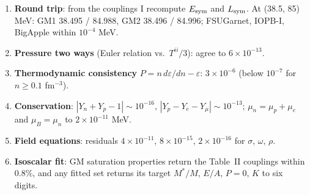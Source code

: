\documentclass[11pt,a4paper]{article}
\newcommand{\Esym}{E_{\rm sym}}
\newcommand{\Lsym}{L_{\rm sym}}
\begin{document}
\begin{enumerate}
\item \textbf{Round trip}: from the couplings I recompute $\Esym$ and $\Lsym$. At (38.5, 85) MeV: GM1 38.495 / 84.988, GM2 38.496 / 84.996; FSUGarnet, IOPB-I, BigApple within $10^{-4}$ MeV.
\item \textbf{Pressure two ways} (Euler relation vs.\ $T^{ii}/3$): agree to $6\times10^{-13}$.
\item \textbf{Thermodynamic consistency} $P=n\,d\varepsilon/dn-\varepsilon$: $3\times10^{-6}$ (below $10^{-7}$ for $n\ge0.1$ fm$^{-3}$).
\item \textbf{Conservation}: $|Y_n+Y_p-1|\sim10^{-16}$, $|Y_p-Y_e-Y_\mu|\sim10^{-13}$; $\mu_n=\mu_p+\mu_e$ and $\mu_B=\mu_n$ to $2\times10^{-11}$ MeV.
\item \textbf{Field equations}: residuals $4\times10^{-11}$, $8\times10^{-15}$, $2\times10^{-16}$ for $\sigma$, $\omega$, $\rho$.
\item \textbf{Isoscalar fit}: GM saturation properties return the Table~II couplings within 0.8\%, and any fitted set returns its target $M^*/M$, $E/A$, $P=0$, $K$ to six digits.
\end{enumerate}
\end{document}
